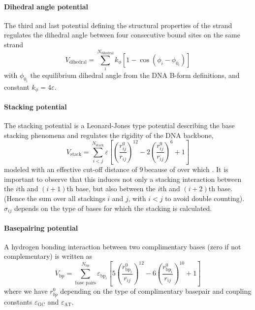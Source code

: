 \paragraph{Dihedral angle potential} The third and last potential defining the structural properties of the strand regulates the dihedral angle between four consecutive bound sites on the same strand
\begin{equation}
V_\text{dihedral} =  \sum_i^{N_\text{dihedral}} k_\phi \left[ 1 - \cos (\phi_i - \phi_{0_i}) \right]
\end{equation}
with $\phi_{0_i}$ the equilibrium dihedral angle from the DNA B-form definitions, and constant $k_\phi = 4\varepsilon$.

\paragraph{Stacking potential} The stacking potential is a Leonard-Jones type potential describing the base stacking phenomena and regulates the rigidity of the DNA backbone,
\begin{equation}
V_\text{stack} =  \sum_{i<j}^{N_\text{stack}} \varepsilon \left[ \left(\frac{r^0_{ij}}{r_{ij}} \right)^{12} - 2\left(\frac{r^0_{ij}}{r_{ij}} \right)^{6} + 1\right]
\end{equation}
modeled with an effective cut-off distance of $9$\,\Angstrom because of over which . It is important to observe that this induces not only a stacking interaction between the $i$th and $(i+1)$th base, but also between the $i$th and $(i+2)$th base. (Hence the sum over all stackings $i$ and $j$, with $i < j$ to avoid double counting). $\sigma_{ij}$ depends on the type of bases for which the stacking is calculated.

\paragraph{Basepairing potential} A hydrogen bonding interaction between two complimentary bases (zero if not complementary) is written as
\begin{equation}
V_\text{bp} =  \sum_{\text{base pairs}}^{N_\text{bp}} \varepsilon_{\text{bp}_i} \left[ 5\left(\frac{r^0_{\text{bp}_i}}{r_{ij}} \right)^{12} - 6\left(\frac{r^0_{\text{bp}_i}}{r_{ij}} \right)^{10} + 1\right]
\end{equation}
where we have $r^0_{bp}$ depending on the type of complimentary basepair and coupling constants $\varepsilon_\text{GC}$ and $\varepsilon_\text{AT}$.

